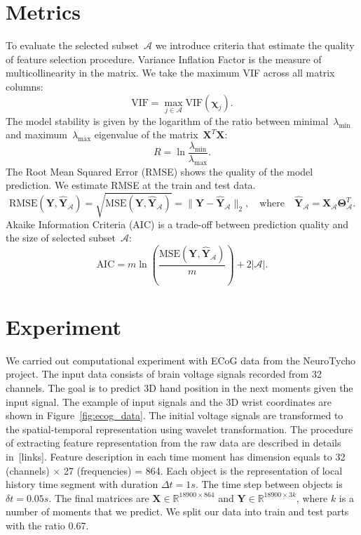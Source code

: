 \documentclass[12pt,twoside]{article}
\newcommand{\bY}{\mathbf{Y}}
\newcommand{\bX}{\mathbf{X}}
\newcommand{\bbR}{\mathbb{R}}
\newcommand{\cA}{\mathcal{A}}
\newcommand{\bchi}{\boldsymbol{\chi}}
\newcommand{\bTheta}{\boldsymbol{\Theta}}
\begin{document}
\section{Metrics}

To evaluate the selected subset~$\cA$ we introduce criteria that estimate the quality of feature selection procedure. 
Variance Inflation Factor is the measure of multicollinearity in the matrix. We take the maximum VIF across all matrix columns:  
\[
	\text{VIF} = \max_{j \in \cA} \text{VIF} (\bchi_j).
\]
The model stability is given by the logarithm of the ratio between minimal~$\lambda_{\min}$ and maximum~$\lambda_{\max}$ eigenvalue of the matrix~$\bX^T \bX$:
\[
	R = \ln \frac{\lambda_{\min}}{\lambda_{\max}}.
\]
The Root Mean Squared Error (RMSE) shows the quality of the model prediction. We estimate RMSE at the train and test data.
\[
	\text{RMSE}(\bY, \widehat{\bY}_{\cA}) = \sqrt{\text{MSE} (\bY, \widehat{\bY}_{\cA})} =  \| \bY - \widehat{\bY}_{\cA} \|_2, \quad \text{where} \quad \widehat{\bY}_{\cA} = \bX_{\cA} \bTheta_{\cA}^T.
\]
Akaike Information Criteria (AIC) is a trade-off between prediction quality and the size of selected subset~$\cA$:
\[
	\text{AIC} = m \ln \left( \frac{\text{MSE} ( \bY, \widehat{\bY}_{\cA})}{m}\right) + 2 | \cA |.
\]

\section{Experiment}
We carried out computational experiment with ECoG data from the NeuroTycho project. The input data consists of brain voltage signals recorded from 32 channels. 
The goal is to predict 3D hand position in the next moments given the input signal. 
The example of input signals and the 3D wrist coordinates are shown in Figure~\ref{fig:ecog_data}. 
The initial voltage signals are transformed to the spatial-temporal representation using wavelet transformation. 
The procedure of extracting feature representation from the raw data are described in details in~[links]. 
Feature description in each time moment has dimension equals to 32 (channels) $\times$ 27 (frequencies) = 864. 
Each object is the representation of local history time segment with duration $\Delta t = 1s$. The time step between objects is $\delta t =  0.05s$. 
The final matrices are $\bX \in \bbR^{18900 \times 864}$ and $\bY \in \bbR^{18900 \times 3k}$, where $k$ is a number of moments that we predict. 
We split our data into train and test parts with the ratio 0.67.
\end{document}
